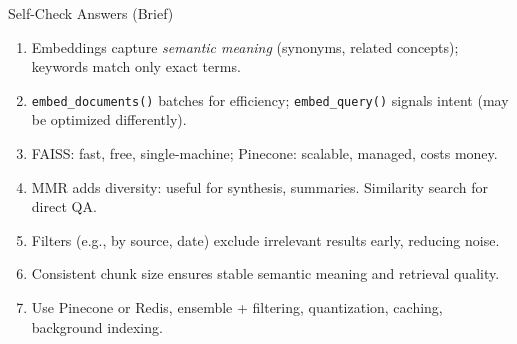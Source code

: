 \documentclass[aspectratio=169,11pt]{beamer}
\begin{document}
\begin{frame}{Self-Check Answers (Brief)}
  \begin{enumerate}
    \setlength{\itemsep}{0pt}
    \item Embeddings capture \emph{semantic meaning} (synonyms, related concepts); keywords match only exact terms.
    \vspace{0.05cm}
    \item \texttt{embed\_documents()} batches for efficiency; \texttt{embed\_query()} signals intent (may be optimized differently).
    \vspace{0.05cm}
    \item FAISS: fast, free, single-machine; Pinecone: scalable, managed, costs money.
    \vspace{0.05cm}
    \item MMR adds diversity: useful for synthesis, summaries. Similarity search for direct QA.
    \vspace{0.05cm}
    \item Filters (e.g., by source, date) exclude irrelevant results early, reducing noise.
    \vspace{0.05cm}
    \item Consistent chunk size ensures stable semantic meaning and retrieval quality.
    \vspace{0.05cm}
    \item Use Pinecone or Redis, ensemble + filtering, quantization, caching, background indexing.
  \end{enumerate}
\end{frame}
\end{document}
